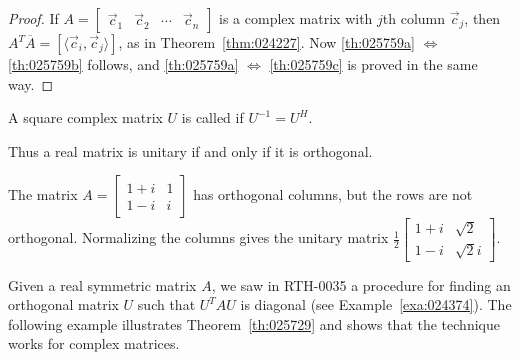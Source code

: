 \documentclass{ximera}
\begin{document}
\begin{proof}
If $A = \left[ \begin{array}{cccc}
\vec{c}_{1} & \vec{c}_{2} & \cdots & \vec{c}_{n}
\end{array}\right]$ is a complex matrix with $j$th column $\vec{c}_{j}$, then $A^T\overline{A} = \left[ \langle \vec{c}_{i}, \vec{c}_{j}\rangle \right]$, as in Theorem~\ref{thm:024227}. Now \ref{th:025759a} $\Leftrightarrow$ \ref{th:025759b} follows, and \ref{th:025759a} $\Leftrightarrow$ \ref{th:025759c} is proved in the same way.
\end{proof}

\begin{definition}\label{def:Unitary}
A square complex matrix $U$ is called  if $U^{-1} = U^{H}$.
\end{definition}

Thus a real matrix is unitary if and only if it is orthogonal.


\begin{example}\label{ex:025787}
The matrix $A = \left[ \begin{array}{rr}
1 + i & 1 \\
1 - i & i
\end{array}\right]$ has orthogonal columns, but the rows are not orthogonal. Normalizing the columns gives the unitary matrix $\frac{1}{2}\left[ \begin{array}{rr}
	1 + i & \sqrt{2} \\
	1 - i & \sqrt{2}i
\end{array}\right]$.
\end{example}

Given a real symmetric matrix $A$, we saw in RTH-0035 a procedure for finding an orthogonal matrix $U$ such that $U^{T}AU$ is diagonal (see Example~\ref{exa:024374}). The following example illustrates Theorem~\ref{th:025729} and shows that the technique works for complex matrices.
\end{document}
